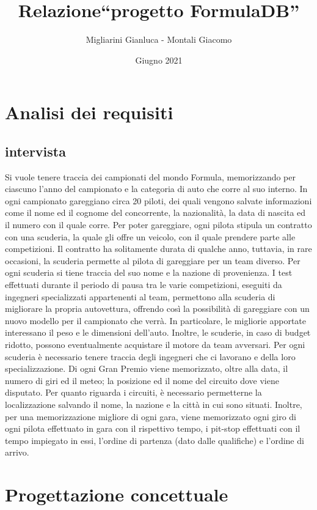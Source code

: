 \documentclass[a4paper,12pt]{report}
\title{Relazione\break``progetto FormulaDB''}
\author{Migliarini Gianluca - Montali Giacomo}
\date{Giugno 2021}
\begin{document}
	
	\maketitle
	\chapter{Analisi dei requisiti}
		\section{intervista}
		{\fontsize{12.5}{20}\selectfont
		Si vuole tenere traccia dei campionati del mondo Formula, memorizzando per ciascuno l'anno del campionato e la categoria di auto che corre al suo interno.
		In ogni campionato gareggiano circa 20 piloti, dei quali vengono salvate informazioni come il nome ed il cognome del concorrente,
		la nazionalità, la data di nascita ed il numero con il quale corre.
		Per poter gareggiare, ogni pilota stipula un contratto con una scuderia, la quale gli offre un veicolo, con il quale
		prendere parte alle competizioni. Il contratto ha solitamente durata di qualche anno, tuttavia, in rare occasioni,
		la scuderia permette al pilota di gareggiare per un team diverso.
		Per ogni scuderia si tiene traccia del suo nome e la nazione di provenienza.
		I test effettuati durante il periodo di pausa tra le varie competizioni, eseguiti da ingegneri specializzati appartenenti al team,
		permettono alla scuderia di migliorare la propria autovettura, offrendo così la possibilità di gareggiare
		con un nuovo modello per il campionato che verrà. In particolare, le migliorie apportate interessano il peso e le dimensioni dell'auto.
		Inoltre, le scuderie, in caso di budget ridotto, possono eventualmente acquistare il motore da team avversari.
		Per ogni scuderia è necessario tenere traccia degli ingegneri che ci lavorano e della loro specializzazione.
		Di ogni Gran Premio viene memorizzato, oltre alla data, il numero di giri ed il meteo;
		la posizione ed il nome del circuito dove viene disputato.
		Per quanto riguarda i circuiti, è necessario permetterne la localizzazione salvando il nome, la nazione e la città in cui sono situati.
		Inoltre, per una memorizzazione migliore di ogni gara, viene memorizzato ogni giro di ogni pilota effettuato in gara con il rispettivo tempo,
		i pit-stop effettuati con il tempo impiegato in essi, l'ordine di partenza (dato dalle qualifiche) e l'ordine di arrivo.}
	\newpage
	\chapter{Progettazione concettuale}
\end{document}

